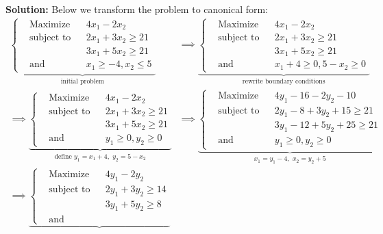 \documentclass{article}
\begin{document}
\noindent\textbf{Solution:} Below we transform the problem to canonical form:
\begin{align*}
    \underbrace{\left\{\begin{aligned}
        &{\text{Maximize}}
        &&4x_1-2x_2 \\
        &{\text{subject to}}
        &&2x_1+3x_2\ge21\\
        &
        &&3x_1+5x_2\ge21\\
        &{\text{and}}
        &&x_1\ge-4,x_2\le5
    \end{aligned}\right.}_{\text{initial problem}}&\implies
    \underbrace{\left\{\begin{aligned}
        &{\text{Maximize}}
        &&4x_1-2x_2 \\
        &{\text{subject to}}
        &&2x_1+3x_2\ge21\\
        &
        &&3x_1+5x_2\ge21\\
        &{\text{and}}
        &&x_1+4\ge0,5-x_2\ge0
    \end{aligned}\right.}_{\text{rewrite boundary conditions}}\\
    \implies
    \underbrace{\left\{\begin{aligned}
        &{\text{Maximize}}
        &&4x_1-2x_2\\
        &{\text{subject to}}
        &&2x_1+3x_2\ge21\\
        &
        &&3x_1+5x_2\ge21\\
        &{\text{and}}
        &&y_1\ge0,y_2\ge0
    \end{aligned}\right.}_{\text{define }y_1=x_1+4,\,\,y_2=5-x_2}
    &\implies
    \underbrace{\left\{\begin{aligned}
        &{\text{Maximize}}
        &&4y_1-16-2y_2-10 \\
        &{\text{subject to}}
        &&2y_1-8+3y_2+15\ge21\\
        &
        &&3y_1-12+5y_2+25\ge21\\
        &{\text{and}}
        &&y_1\ge0,y_2\ge0
    \end{aligned}\right.}_{x_1=y_1-4,\,\,x_2=y_2+5}\\
    \implies
    \underbrace{\left\{\begin{aligned}
        &{\text{Maximize}}
        &&4y_1-2y_2 \\
        &{\text{subject to}}
        &&2y_1+3y_2\ge14\\
        &
        &&3y_1+5y_2\ge8\\
        &{\text{and}}

\end{aligned}}
\end{align*}
\end{document}
